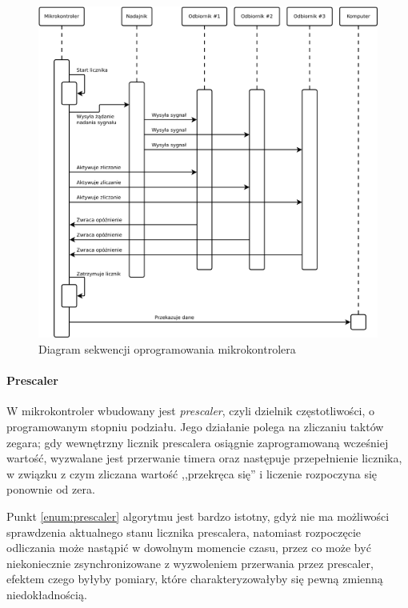 \begin{figure}
 \hspace{-10em}
 \includegraphics[width=45em]{gfx/diagramy/diagram_sekwencji_sprzetu.pdf}
 \caption{Diagram sekwencji oprogramowania mikrokontrolera}
 \label{fig:firmware_sequence_diagram}
\end{figure}

\paragraph{Prescaler}
W mikrokontroler wbudowany jest \textsl{prescaler}, czyli dzielnik częstotliwości, o programowanym stopniu podziału. Jego działanie polega na zliczaniu taktów zegara; gdy wewnętrzny licznik prescalera osiągnie zaprogramowaną wcześniej wartość, wyzwalane jest przerwanie timera oraz następuje przepełnienie licznika, w związku z czym zliczana wartość ,,przekręca się'' i liczenie rozpoczyna się ponownie od zera.

Punkt \ref{enum:prescaler} algorytmu jest bardzo istotny, gdyż nie ma możliwości sprawdzenia aktualnego stanu licznika prescalera, natomiast rozpoczęcie odliczania może nastąpić w dowolnym momencie czasu, przez co może być niekoniecznie zsynchronizowane z wyzwoleniem przerwania przez prescaler, efektem czego byłyby pomiary, które charakteryzowałyby się pewną zmienną niedokładnością.

